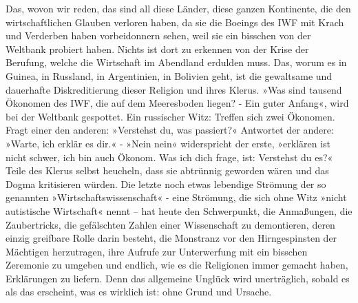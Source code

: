 Das, wovon wir reden, das sind all diese Länder, diese ganzen
Kontinente, die den wirtschaftlichen Glauben verloren haben, da sie
die Boeings des IWF mit Krach und Verderben haben vorbeidonnern
sehen, weil sie ein bisschen von der Weltbank probiert haben.
Nichts ist dort zu erkennen von der Krise der Berufung, welche die
Wirtschaft im Abendland erdulden muss. Das, worum es in Guinea, in
Russland, in Argentinien, in Bolivien geht, ist die gewaltsame und
dauerhafte Diskreditierung dieser Religion und ihres Klerus. »Was
sind tausend Ökonomen des IWF, die auf dem Meeresboden liegen? -
Ein guter Anfang«, wird bei der Weltbank gespottet. Ein russischer
Witz: Treffen sich zwei Ökonomen. Fragt einer den anderen:
»Verstehst du, was passiert?« Antwortet der andere: »Warte, ich
erklär es dir.« - »Nein nein« widerspricht der erste, »erklären ist
nicht schwer, ich bin auch Ökonom. Was ich dich frage, ist:
Verstehst du es?« Teile des Klerus selbst heucheln, dass sie
abtrünnig geworden wären und das Dogma kritisieren würden. Die
letzte noch etwas lebendige Strömung der so genannten
»Wirtschaftswissenschaft« - eine Strömung, die sich ohne Witz
»nicht autistische Wirtschaft« nennt – hat heute den Schwerpunkt,
die Anmaßungen, die Zaubertricks, die gefälschten Zahlen einer
Wissenschaft zu demontieren, deren einzig greifbare Rolle darin
besteht, die Monstranz vor den Hirngespinsten der Mächtigen
herzutragen, ihre Aufrufe zur Unterwerfung mit ein bisschen
Zeremonie zu umgeben und endlich, wie es die Religionen immer
gemacht haben, Erklärungen zu liefern. Denn das allgemeine Unglück
wird unerträglich, sobald es als das erscheint, was es wirklich
ist: ohne Grund und Ursache.

\extrapar{}

